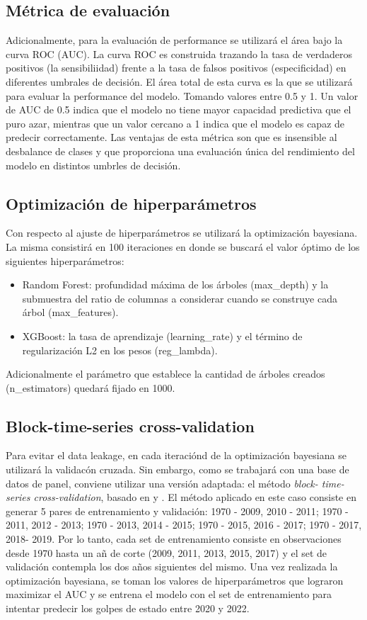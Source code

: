 \documentclass{article}
\begin{document}
\subsection{Métrica de evaluación}
Adicionalmente, para la evaluación de performance se utilizará el área bajo la curva ROC 
(AUC). La curva ROC es construida trazando la tasa de verdaderos positivos (la 
sensibiliidad) frente a la tasa de falsos positivos (especificidad) en diferentes umbrales 
de decisión. El área total de esta curva es la que se utilizará para evaluar la 
performance del modelo. Tomando valores entre 0.5 y 1. Un valor de AUC de 0.5 indica que 
el modelo no tiene mayor capacidad predictiva que el puro azar, mientras que un valor 
cercano a 1 indica que el modelo es capaz de predecir correctamente. Las ventajas de esta
métrica son que es insensible al desbalance de clases y que proporciona una evaluación
única del rendimiento del modelo en distintos umbrles de decisión.

\subsection{Optimización de hiperparámetros}
Con respecto al ajuste de 
hiperparámetros se utilizará la optimización bayesiana. La misma consistirá en 100 
iteraciones en donde se buscará el valor óptimo de los siguientes hiperparámetros:

\begin{itemize}
  \item Random Forest: profundidad máxima de los árboles (max\_depth) y la 
  submuestra del ratio de columnas a considerar cuando se construye cada árbol 
  (max\_features).
  \item XGBoost: la tasa de aprendizaje (learning\_rate) y el término de 
  regularización L2 en los pesos (reg\_lambda).
\end{itemize}

Adicionalmente el parámetro que establece la cantidad de árboles creados 
(n\_estimators) quedará fijado en 1000.

\subsection{Block-time-series cross-validation}
Para evitar el data leakage, en cada iteraciónd de la optimización bayesiana
se utilizará la validacón cruzada. Sin embargo, como se trabajará con una base
de datos de panel, conviene utilizar una versión adaptada: el método \textit{block-
time-series cross-validation}, basado en \cite{Bur94} y \cite{RAc00}. El método 
aplicado en este caso consiste en generar 5 pares de entrenamiento y validación: 
{1970 - 2009, 2010 - 2011}; {1970 - 2011, 2012 - 2013}; {1970 - 2013, 2014 - 2015}; 
{1970 - 2015, 2016 - 2017}; {1970 - 2017, 2018- 2019}. Por lo tanto, cada set de 
entrenamiento consiste en observaciones desde 1970 hasta un añ de corte (2009, 
2011, 2013, 2015, 2017) y el set de validación contempla los dos años siguientes 
del mismo. Una vez realizada la optimización bayesiana, se toman los valores de 
hiperparámetros que lograron maximizar el AUC y se entrena el modelo con el set de 
entrenamiento para intentar predecir los golpes de estado entre 2020 y 2022. 
\end{document}
